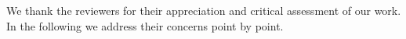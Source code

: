 




\vspace{1em}

\section*{\mytitle}
We thank the reviewers for their appreciation and critical assessment of our work.
In the following we address their concerns point by point.





